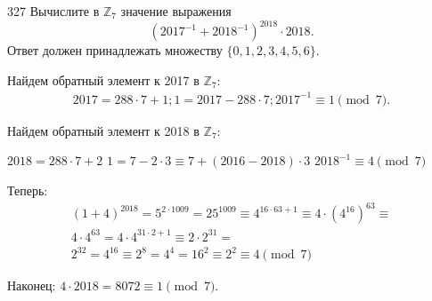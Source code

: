 \begin{task}{327}
Вычислите в $\mathbb{Z}_7$ значение выражения
\[\left(2017^{-1}+2018^{−1}\right)^{2018}\cdot2018.\] Ответ должен принадлежать множеству $\{0,1,2,3,4,5,6\}$.
\end{task}

\begin{solution}


 Найдем обратный элемент к 2017 в $\mathbb{Z}_7$:
 \begin{gather*}
 2017 = 288\cdot7 + 1;
 1 = 2017 - 288\cdot7;
 2017^{-1} \equiv 1 \pmod{7}.
 \end{gather*}\par
 
 Найдем обратный элемент к 2018 в $\mathbb{Z}_7$:
 \begin{center}
 $2018 = 288\cdot7 + 2$\newline
 $1 = 7 - 2\cdot3 \equiv 7 + (2016 - 2018)\cdot3 $\newline
 $2018^{-1} \equiv 4 \pmod{7}$\newline
 \end{center}\par
 
 Теперь:
 \begin{gather*}
 (1 + 4)^{2018} = 5^{2\cdot1009} = 25^{1009} \equiv 4^{16\cdot63 + 1} \equiv 4\cdot(4^{16})^{63} \equiv \\ 4\cdot4^{63} = 4 \cdot 4^{31\cdot2 + 1} \equiv 2\cdot2^{31} =\\ 2^{32} = 4^{16} \equiv 2^{8} = 4^4 = 16^2 \equiv 2^2 \equiv 4 \pmod{7}
 \end{gather*}\par
 
 Наконец:
 $4\cdot 2018 = 8072 \equiv 1 \pmod{7}$.
\end{solution}